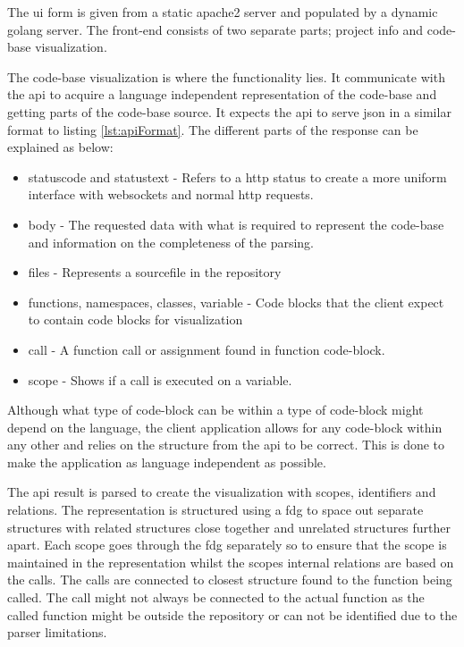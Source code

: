 The \gls{ui} form is given from a static \gls{apache2} server and populated by a dynamic \Gls{golang} server. The front-end consists of two separate parts; project info and code-base visualization.

The code-base visualization is where the functionality lies. It communicate with the \gls{api} to acquire a language independent representation of the code-base and getting parts of the code-base source. It expects the \gls{api} to serve \gls{json} in a similar format to listing \ref{lst:apiFormat}. The different parts of the response can be explained as below:
\begin{itemize}
    \item statuscode and statustext - Refers to a \gls{http} status to create a more uniform interface with \glspl{websocket} and normal \gls{http} requests.
    \item body - The requested data with what is required to represent the code-base and information on the completeness of the parsing.
    \item files - Represents a sourcefile in the repository
    \item functions, namespaces, classes, variable - Code blocks that the \gls{client} expect to contain code blocks for visualization
    \item call - A function call or assignment found in function code-block.
    \item scope - Shows if a call is executed on a variable.
\end{itemize}

Although what type of code-block can be within a type of code-block might depend on the language, the \gls{client} application allows for any code-block within any other and relies on the structure from the \gls{api} to be correct. This is done to make the application as language independent as possible.

The \gls{api} result is parsed to create the visualization with scopes, identifiers and relations. The representation is structured using a \gls{fdg} to space out separate structures with related structures close together and unrelated structures further apart. Each scope goes through the \gls{fdg} separately so to ensure that the scope is maintained in the representation whilst the scopes internal relations are based on the calls. The calls are connected to closest structure found to the function being called. The call might not always be connected to the actual function as the called function might be outside the repository or can not be identified due to the parser limitations. 

